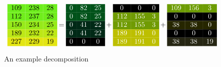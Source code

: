 \begin{figure}[ht]
  \centering
  $$
\columnseprule5mm
\xdefinecolor{r1}{RGB}{109,238,28}
\xdefinecolor{r2}{RGB}{112,237,28}
\xdefinecolor{r3}{RGB}{150,234,25}
\xdefinecolor{r4}{RGB}{189,232,22}
\xdefinecolor{r5}{RGB}{227,229,19}
\begin{matrix}
\rowcolor{r1} 109 & 238 & 28 \\
\rowcolor{r2} 112 & 237 & 28 \\
\rowcolor{r3} 150 & 234 & 25 \\
\rowcolor{r4} 189 & 232 & 22 \\
\rowcolor{r5} 227 & 229 & 19
\end{matrix}
\>\> = \>\>
\xdefinecolor{m1}{RGB}{0,82,25}
\xdefinecolor{m2}{RGB}{112,155,3}
\xdefinecolor{m3}{RGB}{0,41,22}
\xdefinecolor{m4}{RGB}{189,191,0}
\begin{matrix}
\rowcolor{m1}    \color{white}0 & \color{white} 82 & \color{white}25 \\
\rowcolor{m1}    \color{white}0 & \color{white} 82 & \color{white}25 \\
\rowcolor{m3}    \color{white}0 & \color{white} 41 & \color{white}22 \\
\rowcolor{m3}    \color{white}0 & \color{white} 41 & \color{white}22 \\
\rowcolor{black} \color{white}0 & \color{white}  0 & \color{white} 0 \\
\end{matrix}
\>\> + \>\> 
\begin{matrix}
\rowcolor{black} \color{white} 0 & \color{white}  0 & \color{white} 0 \\
\rowcolor{m2} \color{white} 112 & \color{white} 155 & \color{white} 3 \\
\rowcolor{m2} \color{white} 112 & \color{white} 155 & \color{white} 3 \\
\rowcolor{m4} \color{white} 189 & \color{white} 191 & \color{white} 0 \\
\rowcolor{m4} \color{white} 189 & \color{white} 191 & \color{white} 0
\end{matrix}
\>\> + \>\> 
\xdefinecolor{s1}{RGB}{109,156,3}
\xdefinecolor{s2}{RGB}{0,0,0}
\xdefinecolor{s3}{RGB}{38,38,0}
\xdefinecolor{s4}{RGB}{0,0,0}
\xdefinecolor{s5}{RGB}{38,38,19}
\begin{matrix}
\rowcolor{s1} \color{white} 109 & \color{white} 156 & \color{white}   3 \\
\rowcolor{s2} \color{white}   0 & \color{white}   0 &  \color{white}  0 \\
\rowcolor{s3} \color{white}  38 & \color{white}  38 &  \color{white}  0 \\
\rowcolor{s4} \color{white}   0 &  \color{white}  0 &  \color{white}  0 \\
\rowcolor{s5} \color{white}  38 & \color{white}  38 & \color{white}  19
\end{matrix}
$$
  \caption{An example decomposition}
  \label{fig:example}
\end{figure}

